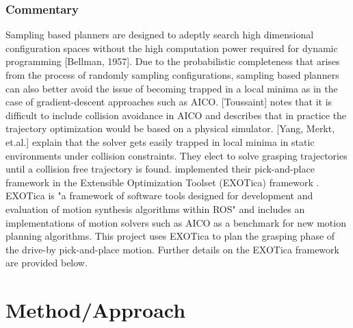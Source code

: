 \documentclass[12pt]{article}
\begin{document}
        \subsubsection{Commentary}
            \par Sampling based planners are designed to adeptly search high dimensional configuration spaces without the high computation power required for dynamic programming [Bellman, 1957]. Due to the probabilistic completeness that arises from the process of randomly sampling configurations, sampling based planners can also better avoid the issue of becoming trapped in a local minima as in the case of gradient-descent approaches such as AICO.
            [Toussaint] notes that it is difficult to include collision avoidance in AICO and describes that in practice the trajectory optimization would be based on a physical simulator. [Yang, Merkt, et.al.] explain that the solver gets easily trapped in local minima in static environments under collision constraints. They elect to solve grasping trajectories until a collision free trajectory is found. \cite{yang_planning_2018} implemented their pick-and-place framework in the Extensible Optimization Toolset (EXOTica) framework \cite{koubaa_exotica_2019}. EXOTica is "a framework of software tools designed for development and evaluation of motion synthesis algorithms within ROS" and includes an implementations of motion solvers such as AICO as a benchmark for new motion planning algorithms.\cite{koubaa_exotica_2019} This project uses EXOTica to plan the grasping phase of the drive-by pick-and-place motion. Further details on the EXOTica framework are provided below.
    \newpage
    \section{Method/Approach}
\end{document}

